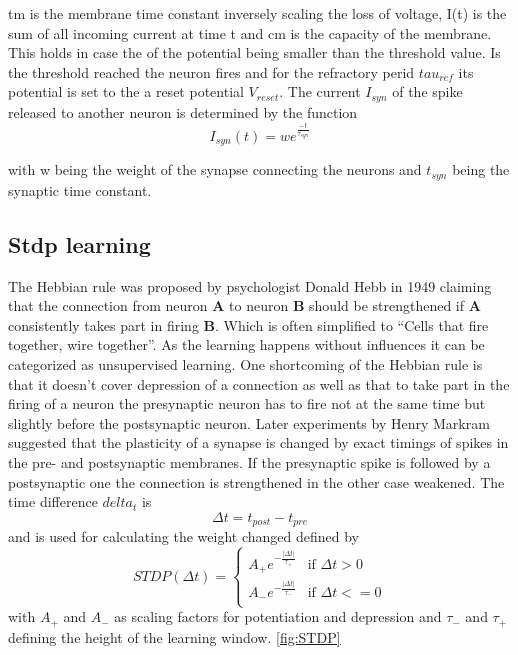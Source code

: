 tm is the membrane time constant inversely scaling the loss of voltage,  I(t) is the sum of all incoming current at time t and cm is the capacity of the membrane. This holds in case the of the potential being smaller than the threshold value. Is the threshold reached the neuron fires and for the refractory perid $tau_{ref}$ its potential is set to the a reset potential $V_{reset}$. The current $I_{syn}$ of the spike released to another neuron is determined by the function
\begin{equation}
  I_{syn}(t)=we^{\frac{-t}{\tau_{syn}}}
\end{equation}

with w being the weight of the synapse connecting the neurons and $t_{syn}$ being the synaptic time constant.

\subsection{Stdp learning}
The Hebbian rule was proposed by psychologist Donald Hebb in 1949 claiming that the connection from neuron \textbf{A} to neuron \textbf{B} should be strengthened if \textbf{A} consistently takes part in firing \textbf{B}. Which is often simplified to “Cells that fire together, wire together”. As the learning happens without influences it can be categorized as unsupervised learning.
One shortcoming of the Hebbian rule is that it doesn’t cover depression of a connection as well as that to take part in the firing of a neuron the presynaptic neuron has to fire not at the same time but slightly before the postsynaptic neuron.
Later experiments by Henry Markram suggested that the plasticity of a synapse is changed by exact timings of spikes in the pre- and postsynaptic membranes. If the presynaptic spike is followed by a postsynaptic one the connection is strengthened in the other case weakened.
The time difference $delta_t$ is
\begin{equation}
  \Delta t = t_{post} - t_{pre}
\end{equation}
and is used for calculating the weight changed defined by
\begin{equation}
  STDP(\Delta t) = 
  \begin{cases}
    A_+ e^{-\frac{\vert \Delta t \vert }{\tau_+}} & \text{if $\Delta t>0$} \\
    A_- e^{-\frac{\vert \Delta t \vert }{\tau_-}} & \text{if $\Delta t<=0$} \\
  \end{cases}
\end{equation}
with $A_+$ and $A_-$ as scaling factors for potentiation and depression and $\tau_-$ and $\tau_+$ defining the height of the learning window. \autoref{fig:STDP}

